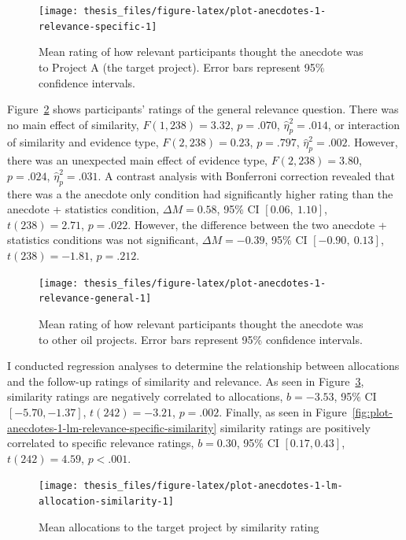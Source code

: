 \documentclass[a4paper, nobind, dvipsnames]{templates/ociamthesis}
\theoremstyle{definition}
\theoremstyle{definition}
\theoremstyle{definition}
\theoremstyle{definition}
\theoremstyle{remark}
\begin{document}
\begin{figure}
\texttt{[image: thesis\_files/figure-latex/plot-anecdotes-1-relevance-specific-1]} \caption{Mean rating of how relevant participants thought the anecdote was to Project A (the target project). Error bars represent 95\% confidence intervals.}\label{fig:plot-anecdotes-1-relevance-specific}
\end{figure}

Figure~\ref{fig:plot-anecdotes-1-relevance-general} shows participants' ratings
of the general relevance question. There was no main effect of similarity,
\(F(1, 238) = 3.32\), \(p = .070\), \(\hat{\eta}^2_p = .014\), or interaction of
similarity and evidence type,
\(F(2, 238) = 0.23\), \(p = .797\), \(\hat{\eta}^2_p = .002\). However, there was
an unexpected main effect of evidence type,
\(F(2, 238) = 3.80\), \(p = .024\), \(\hat{\eta}^2_p = .031\). A contrast analysis with
Bonferroni correction revealed that there was a the anecdote only condition had
significantly higher rating than the anecdote + statistics condition,
\(\Delta M = 0.58\), 95\% CI \([0.06,~1.10]\), \(t(238) = 2.71\), \(p = .022\). However, the
difference between the two anecdote + statistics conditions was not significant,
\(\Delta M = -0.39\), 95\% CI \([-0.90,~0.13]\), \(t(238) = -1.81\), \(p = .212\).



\begin{figure}
\texttt{[image: thesis\_files/figure-latex/plot-anecdotes-1-relevance-general-1]} \caption{Mean rating of how relevant participants thought the anecdote was to other oil projects. Error bars represent 95\% confidence intervals.}\label{fig:plot-anecdotes-1-relevance-general}
\end{figure}

I conducted regression analyses to determine the relationship between
allocations and the follow-up ratings of similarity and relevance. As seen in
Figure~\ref{fig:plot-anecdotes-1-lm-allocation-similarity}, similarity ratings
are negatively correlated to allocations,
\(b = -3.53\), 95\% CI \([-5.70, -1.37]\), \(t(242) = -3.21\), \(p = .002\). Finally, as seen in
Figure~\ref{fig:plot-anecdotes-1-lm-relevance-specific-similarity} similarity
ratings are positively correlated to specific relevance ratings,
\(b = 0.30\), 95\% CI \([0.17, 0.43]\), \(t(242) = 4.59\), \(p < .001\).



\begin{figure}
\texttt{[image: thesis\_files/figure-latex/plot-anecdotes-1-lm-allocation-similarity-1]} \caption{Mean allocations to the target project by similarity rating}\label{fig:plot-anecdotes-1-lm-allocation-similarity}
\end{figure}
\end{document}
